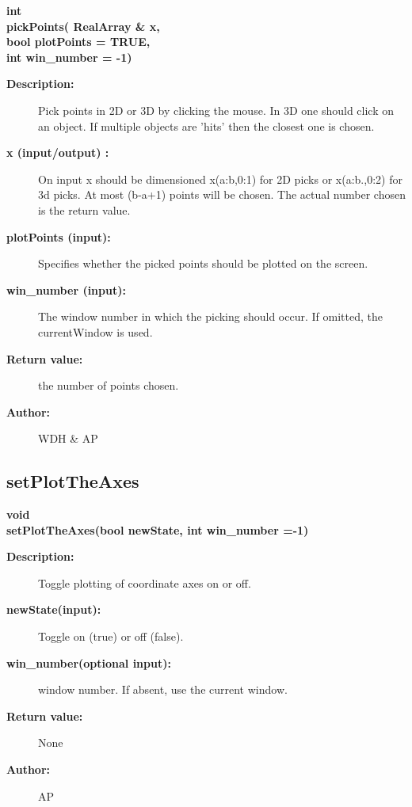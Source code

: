 \begin{flushleft} \textbf{%
int  \\ 
\settowidth{\GLGraphicsInterfaceIncludeArgIndent}{pickPoints(}%
pickPoints( RealArray \& x, \\ 
\hspace{\GLGraphicsInterfaceIncludeArgIndent}bool plotPoints  = TRUE,\\ 
\hspace{\GLGraphicsInterfaceIncludeArgIndent}int win\_number  = -1)
}\end{flushleft}
\begin{description}
\item[{\bf Description:}]  Pick points in 2D or 3D by clicking the mouse.
    In 3D one should click on an object.
    If multiple objects are 'hits' then the closest one is chosen.
\item[{\bf x (input/output) :}]  On input x should be dimensioned x(a:b,0:1) for 2D picks
   or x(a:b.,0:2) for 3d picks. At most (b-a+1) points will be chosen. The actual number
 chosen is the return value.
\item[{\bf plotPoints (input):}]  Specifies whether the picked points should be plotted on the screen.
\item[{\bf win\_number (input):}]  The window number in which the picking should occur. If omitted, the 
                       currentWindow is used.
\item[{\bf Return value:}]  the number of points chosen.
\item[{\bf Author:}]  WDH \& AP
\end{description}
\subsection{setPlotTheAxes}
 
\begin{flushleft} \textbf{%
void  \\ 
\settowidth{\GLGraphicsInterfaceIncludeArgIndent}{setPlotTheAxes(}%
setPlotTheAxes(bool newState, int win\_number  =-1)
}\end{flushleft}
\begin{description}
\item[{\bf Description:}] 
 Toggle plotting of coordinate axes on or off.
\item[{\bf newState(input):}]  Toggle on (true) or off (false).
\item[{\bf win\_number(optional input):}]  window number. If absent, use the current window.

\item[{\bf Return value:}]  None
\item[{\bf Author:}]  AP
\end{description}
